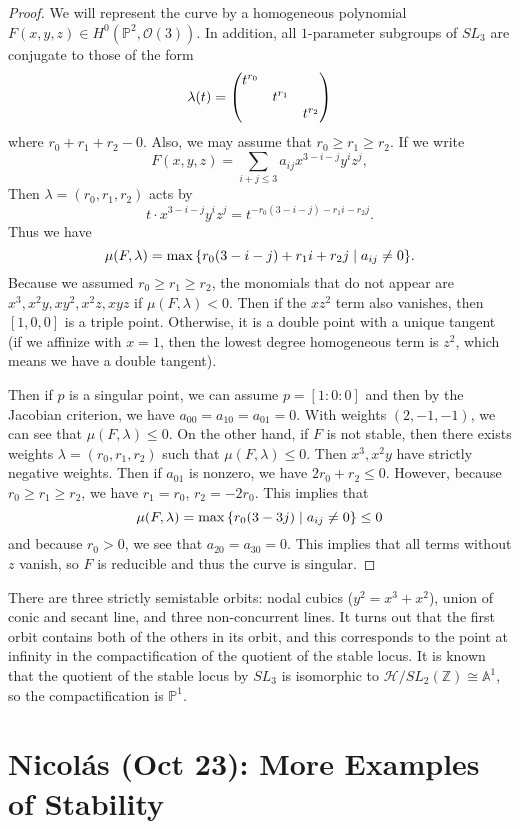 \documentclass[leqno, openany]{memoir}
\theoremstyle{definition}
\theoremstyle{remark}
\theoremstyle{plain}
\theoremstyle{definition}
\theoremstyle{remark}
\newcommand{\A}{\mathbb{A}}
\newcommand{\Z}{\mathbb{Z}}
\renewcommand{\P}{\mathbb{P}}
\newcommand{\mc}[1]{\mathcal{#1}}
\begin{document}
\begin{proof}
    We will represent the curve by a homogeneous polynomial $F(x,y,z) \in H^0(\P^2, \mc{O}(3))$. In addition, all $1$-parameter subgroups of $SL_3$ are conjugate to those of the form
    \[ \lambda(t) = \mqty(\dmat{t^{r_0}, t^{r_1}, t^{r_2}}) \]
    where $r_0 + r_1 + r_2 - 0$. Also, we may assume that $r_0 \geq r_1 \geq r_2$. If we write 
    \[ F(x,y,z) = \sum_{i+j \leq 3} a_{ij} x^{3-i-j} y^i z^j, \]
    Then $\lambda = (r_0, r_1, r_2)$ acts by
    \[ t \cdot x^{3-i-j} y^i z^j = t^{-r_0(3-i-j) - r_1 i - r_2 j}. \]
    Thus we have
    \[ \mu(F, \lambda) = \max \qty{ r_0(3-i-j) + r_1 i + r_2 j \mid a_{ij} \neq 0 }. \]
    Because we assumed $r_0 \geq r_1 \geq r_2$, the monomials that do not appear are $x^3, x^2 y, xy^2, x^2 z, xyz$ if $\mu(F, \lambda) < 0$. Then if the $xz^2$ term also vanishes, then $[1,0,0]$ is a triple point. Otherwise, it is a double point with a unique tangent (if we affinize with $x = 1$, then the lowest degree homogeneous term is $z^2$, which means we have a double tangent).

    Then if $p$ is a singular point, we can assume $p = [1:0:0]$ and then by the Jacobian criterion, we have $a_{00} = a_{10} = a_{01} = 0$. With weights $(2,-1,-1)$, we can see that $\mu(F, \lambda) \leq 0$. On the other hand, if $F$ is not stable, then there exists weights $\lambda = (r_0, r_1, r_2)$ such that $\mu(F, \lambda) \leq 0$. Then $x^3, x^2y$ have strictly negative weights. Then if $a_{01}$ is nonzero, we have $2r_0 + r_2 \leq 0$. However, because $r_0 \geq r_1 \geq r_2$, we have $r_1 = r_0$, $r_2 = -2r_0$. This implies that
    \[ \mu(F, \lambda) = \max \qty{r_0(3-3j) \mid a_{ij} \neq 0} \leq 0 \]
    and because $r_0 > 0$, we see that $a_{20} = a_{30} = 0$. This implies that all terms without $z$ vanish, so $F$ is reducible and thus the curve is singular.
\end{proof}

There are three strictly semistable orbits: nodal cubics ($y^2 = x^3 + x^2$), union of conic and secant line, and three non-concurrent lines. It turns out that the first orbit contains both of the others in its orbit, and this corresponds to the point at infinity in the compactification of the quotient of the stable locus. It is known that the quotient of the stable locus by $SL_3$ is isomorphic to $\mc{H} / SL_2(\Z) \cong \A^1$, so the compactification is $\P^1$.

\chapter{Nicol\'as (Oct 23): More Examples of Stability}%
\label{cha:nicolas_oct_23_more_examples_of_stability}
\end{document}
